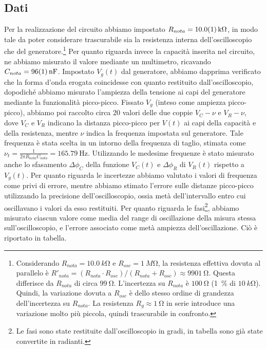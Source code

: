\documentclass[a4paper]{article}
\begin{document}
\subsection{Dati}
Per la realizzazione del circuito abbiamo impostato $R_{nota} = \SI{10.0 \pm 0.1}{k\ohm}$, in modo tale da poter considerare trascurabile sia la resistenza interna dell'oscilloscopio che del generatore.\footnote{Considerando $R_{nota} = \SI{10.0}{k\ohm}$ e $R_{osc} = \SI{1}{M\ohm}$, la resistenza effettiva dovuta al parallelo è $R'_{nota} = (R_{nota} \cdot R_{osc})/(R_{nota} + R_{osc}) \approx \SI{9901}{\ohm}$. Questa differisce da $R_{nota}$ di circa $\SI{99}{\ohm}$. L'incertezza su $R_{nota}$ è $\SI{100}{\ohm}$ (\SI{1}{\percent} di $\SI{10}{k\ohm}$). Quindi, la variazione dovuta a $R_{osc}$ è dello stesso ordine di grandezza dell'incertezza su $R_{nota}$. La resistenza $R_g \approx \SI{1}{\ohm}$ in serie introduce una variazione molto più piccola, quindi trascurabile in confronto.}
Per quanto riguarda invece la capacità inserita nel circuito, ne abbiamo misurato il valore mediante un multimetro, ricavando $C_{nota} = \SI{96 \pm 1}{nF}$.
Impostato $V_g(t)$ dal generatore, abbiamo dapprima verificato che la forma d'onda erogata coincidesse con quanto restituito dall'oscilloscopio, dopodiché abbiamo misurato l'ampiezza della tensione ai capi del generatore mediante la funzionalità picco-picco. Fissato $V_g$ (inteso come ampiezza picco-picco), abbiamo poi raccolto circa 20 valori delle due coppie $V_C - \nu$ e $V_R - \nu$, dove $V_C$ e $V_R$ indicano la distanza picco-picco per $V(t)$ ai capi della capacità e della resistenza, mentre $\nu$ indica la frequenza impostata sul generatore. Tale frequenza è stata scelta in un intorno della frequenza di taglio, stimata come $\nu_t = \frac{1}{2\pi R_{nota}C_{nota}} = \SI{165.79}{\hertz}$.
Utilizzando le medesime frequenze è stato misurato anche lo sfasamento $\Delta\phi_C$ della funzione $V_C(t)$ e $\Delta\phi_R$ di $V_R(t)$ rispetto a $V_g(t)$. Per quanto riguarda le incertezze abbiamo valutato i valori di frequenza come privi di errore, mentre abbiamo stimato l'errore sulle distanze picco-picco utilizzando la precisione dell'oscilloscopio, ossia metà dell'intervallo entro cui oscillavano i valori da esso restituiti. Per quanto riguarda le fasi\footnote{Le fasi sono state restituite dall'oscilloscopio in gradi, in tabella sono già state convertite in radianti.}, abbiamo misurato ciascun valore come media del range di oscillazione della misura stessa sull'oscilloscopio, e l'errore associato come metà ampiezza dell'oscillazione.
Ciò è riportato in tabella.
\end{document}

